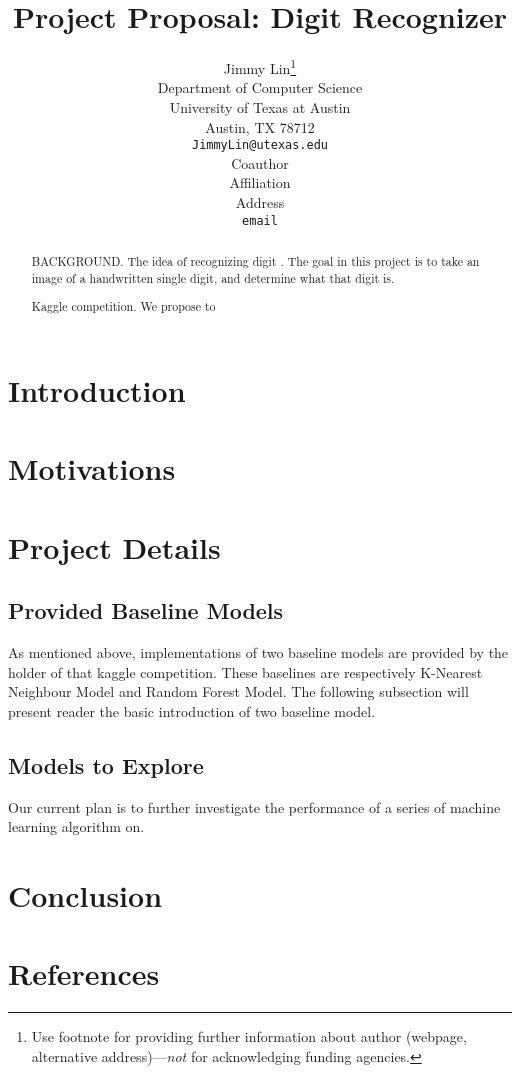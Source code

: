 \documentclass{article} %
\title{Project Proposal: Digit Recognizer}
\author{
Jimmy Lin\thanks{ Use footnote for providing further information
about author (webpage, alternative address)---\emph{not} for acknowledging
funding agencies.} \\
Department of Computer Science\\
University of Texas at Austin\\
Austin, TX 78712 \\
\texttt{JimmyLin@utexas.edu} \\
\And
Coauthor \\
Affiliation \\
Address \\
\texttt{email} \\
}
\begin{document}
\maketitle

\begin{abstract}
    BACKGROUND. The idea of recognizing digit . 
    The goal in this project is to take an image of a handwritten single
    digit, and determine what that digit is.  
    
    Kaggle competition. 
    We propose to 

\end{abstract}

\section{Introduction}

\section{Motivations}


\section{Project Details}
\subsection{Provided Baseline Models}
As mentioned above, implementations of two baseline models are provided by the
holder of that kaggle competition. These baselines are respectively K-Nearest
Neighbour Model and Random Forest Model. The following subsection will present
reader the basic introduction of two baseline model.  

\subsection{Models to Explore}
Our current plan is to further investigate the performance of a series of machine learning
algorithm on.

\section{Conclusion}

\section{References}
\end{document}
